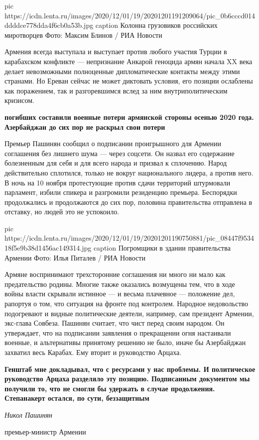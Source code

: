 \ifcmt
pic https://icdn.lenta.ru/images/2020/12/01/19/20201201191209064/pic_0b6cccd014ddddce778dda4f6cb0a53b.jpg
caption Колонна грузовиков российских миротворцев Фото: Максим Блинов / РИА Новости
\fi

Армения всегда выступала и выступает против любого участия Турции в карабахском
конфликте --- непризнание Анкарой геноцида армян начала XX века делает
невозможными полноценные дипломатические контакты между этими странами. Но
Ереван сейчас не может диктовать условия, его позиции ослаблены как поражением,
так и разгоревшимся вслед за ним внутриполитическим кризисом.

\begin{leftbar}
	\bfseries
{\Huge\color{orange}}
погибших
составили военные потери армянской стороны осенью 2020 года. Азербайджан до сих пор не раскрыл свои потери
\end{leftbar}

Премьер Пашинян сообщил о подписании проигрышного для Армении соглашения без
лишнего шума --- через соцсети. Он назвал его содержание болезненным для себя и
для всего народа и призвал к сплочению. Народ действительно сплотился, только
не вокруг национального лидера, а против него. В ночь на 10 ноября протестующие
против сдачи территорий штурмовали парламент, избили спикера и разгромили
резиденцию премьера. Беспорядки продолжались и продолжаются до сих пор,
половина правительства отправлена в отставку, но людей это не успокоило.

\ifcmt
pic https://icdn.lenta.ru/images/2020/12/01/19/20201201190750881/pic_08447f953418f5e9b38d1456ac149314.jpg
caption Погромщики в здании правительства Армении Фото: Илья Питалев / РИА Новости
\fi

Армяне воспринимают трехсторонние соглашения ни много ни мало как предательство
родины. Многие также оказались возмущены тем, что в ходе войны власти скрывали
истинное --- и весьма плачевное --- положение дел, рапортуя о том, что ситуация на
фронте под контролем. Народное недовольство подогревают и видные политические
деятели, например, сам президент Армении, экс-глава Совбеза. Пашинян считает,
что чист перед своим народом. Он утверждает, что на подписании заявления о
прекращении огня настаивали военные, и альтернативы принятому решению не было,
иначе бы Азербайджан захватил весь Карабах. Ему вторит и руководство Арцаха.


\begin{leftbar}
	\bfseries
Генштаб мне докладывал, что с ресурсами у нас проблемы. И политическое
руководство Арцаха разделяло эту позицию. Подписанным документом мы получили
то, что не смогли бы удержать в случае продолжения. Степанакерт остался, по
сути, беззащитным\par
\em
Никол Пашинян\par
премьер-министр Армении 
\end{leftbar}

